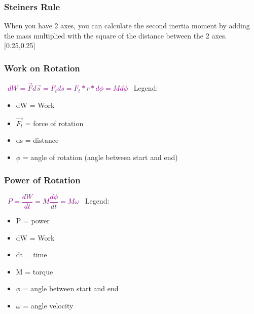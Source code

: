 \documentclass[main.tex,fontsize=8pt,paper=a4,paper=portrait,DIV=calc,]{scrartcl}
\begin{document}
\begin{multicols*}{2}
\subsubsection{Steiners Rule}
When you have 2 axes, you can calculate the second inertia moment by adding the mass multiplied with the square of the distance between the 2 axes.\newline
{}[0.25,0.25]

\subsubsection{Work on Rotation}
\, \newline
\large \textcolor{purple}{\( dW = \vec{F}d\vec{s} = F_t ds = F_t * r * d\phi = Md\phi \)}\newline
\, \newline
\normalsize Legend: \newline
\begin{itemize}
\item dW = Work
\item \(\vec{F_t}\) = force of rotation
\item ds = distance 
\item \(\phi\) = angle of rotation (angle between start and end)
\end{itemize} 

\subsubsection{Power of Rotation}
\, \newline
\large \textcolor{purple}{\( P = \dfrac{dW}{dt} = M \dfrac{d\phi}{dt} = M\omega \)}\newline
\, \newline
\normalsize Legend: \newline
\begin{itemize}
\item P = power
\item dW = Work
\item dt = time  
\item M = torque
\item \(\phi\) = angle between start and end 
\item \(\omega\) = angle velocity
\end{itemize} 


\end{multicols*}
\end{document}
